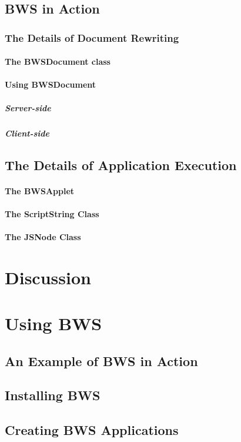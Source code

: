  \subsection{BWS in Action}
  \subsubsection{The Details of Document Rewriting}
   \paragraph{The BWSDocument class}
   \paragraph{Using BWSDocument}
    \subparagraph{Server-side}
    \subparagraph{Client-side}
  \subsection{The Details of Application Execution}
   \paragraph{The BWSApplet}
   \paragraph{The ScriptString Class}
   \paragraph{The JSNode Class}
\section{Discussion}

\section{Using BWS}

 \subsection{An Example of BWS in Action}
 \subsection{Installing BWS}
 \subsection{Creating BWS Applications}
 

